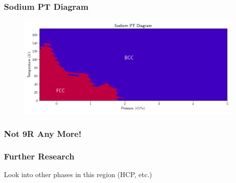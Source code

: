 \documentclass{beamer}
\begin{document}
\begin{frame}
	\frametitle{Sodium PT Diagram}
	\begin{figure}[ht]
	\begin{center}
		\includegraphics[height=2in]{sodium_pt_diagram.png}
	\end{center}
	\end{figure}
\end{frame}

\begin{frame}
	\frametitle{Not 9R Any More!}
\end{frame}

\begin{frame}
	\frametitle{Further Research}
	Look into other phases in this region (HCP, etc.)
\end{frame}
\end{document}
